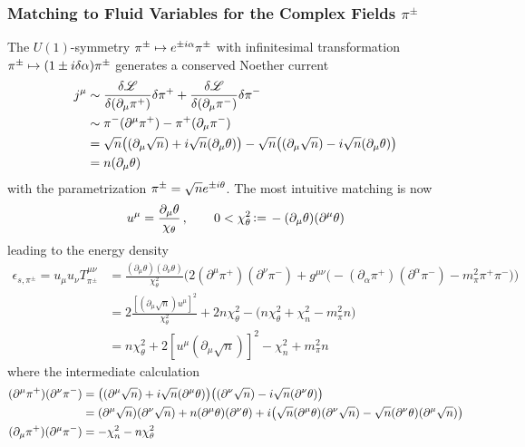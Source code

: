 \subsubsection{Matching to Fluid Variables for the Complex Fields $\pi^\pm$}

The $U(1)$-symmetry $\pi^\pm\mapsto e^{\pm{i}\alpha}\pi^\pm$ with infinitesimal transformation $\pi^\pm\mapsto(1\pm{i}\delta\alpha)\pi^\pm$ generates a conserved Noether current
\begin{subequations}
    \begin{align}
        j^\mu&\sim\frac{\delta\mathscr{L}}{\delta(\partial_\mu\pi^+)}\delta\pi^++\frac{\delta\mathscr{L}}{\delta(\partial_\mu\pi^-)}\delta\pi^-\\
        &\sim\pi^-(\partial^\mu\pi^+)-\pi^+(\partial_\mu\pi^-)\\
        &=\sqrt{n}\big((\partial_\mu\sqrt{n})+{i}\sqrt{n}(\partial_\mu\theta)\big)-\sqrt{n}\big((\partial_\mu\sqrt{n})-{i}\sqrt{n}(\partial_\mu\theta)\big)\\
        &=n(\partial_\mu\theta)
    \end{align}
\end{subequations}
with the parametrization $\pi^\pm=\sqrt{n}e^{\pm{i}\theta}$. The most intuitive matching is now
\begin{equation}
    u^\mu=\frac{\partial_\mu\theta}{\chi_\theta}\,,\qquad 0<\chi_\theta^2{\,\vcentcolon=\,}-(\partial_\mu\theta)(\partial^\mu\theta)
\end{equation}
leading to the energy density
\begin{subequations}
    \begin{align}
        \epsilon_{s,\pi^\pm}=u_\mu u_\nu T^{\mu\nu}_{\pi^\pm}&=\frac{(\partial_\mu\theta)(\partial_\nu\theta)}{\chi_\theta^2}\Big(2(\partial^\mu\pi^+)(\partial^\nu\pi^-)+g^{\mu\nu}\big(-(\partial_\alpha\pi^+)(\partial^\alpha\pi^-)-m_\pi^2\pi^+\pi^-\big)\Big)\\
        &=2\frac{[(\partial_\mu\sqrt{n})u^\mu]^2}{\chi_\theta^2}+2n\chi_\theta^2-\big(n\chi_\theta^2+\chi_n^2-m_\pi^2n\big)\\
        &=n\chi_\theta^2+2[u^\mu(\partial_\mu\sqrt{n})]^2-\chi^2_n+m_\pi^2n
    \end{align}
\end{subequations}
where the intermediate calculation
\begin{subequations}
    \begin{align}
        (\partial^\mu\pi^+)(\partial^\nu\pi^-)&=\big((\partial^\mu\sqrt{n})+{i}\sqrt{n}(\partial^\mu\theta)\big)\big((\partial^\nu\sqrt{n})-{i}\sqrt{n}(\partial^\nu\theta)\big)\\
        &=(\partial^\mu\sqrt{n})(\partial^\nu\sqrt{n})+n(\partial^\mu\theta)(\partial^\nu\theta)+{i}\big(\sqrt{n}(\partial^\mu\theta)(\partial^\nu\sqrt{n})-\sqrt{n}(\partial^\nu\theta)(\partial^\mu\sqrt{n})\big)\\
        (\partial_\mu\pi^+)(\partial^\mu\pi^-)&=-\chi_n^2-n\chi_\theta^2
    \end{align}
\end{subequations}
